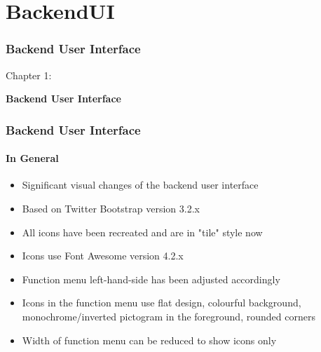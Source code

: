 %

\section{BackendUI}
\begin{frame}[fragile]
	\frametitle{Backend User Interface}

	\begin{center}\huge{Chapter 1:}\end{center}
	\begin{center}\huge{\color{typo3darkgrey}\textbf{Backend User Interface}}\end{center}

\end{frame}


\begin{frame}[fragile]
	\frametitle{Backend User Interface}
	\framesubtitle{In General}

	\begin{itemize}
		\item Significant visual changes of the backend user interface
		\item Based on Twitter Bootstrap version 3.2.x
		\item All icons have been recreated and are in "tile" style now
		\item Icons use Font Awesome version 4.2.x
		\item Function menu left-hand-side has been adjusted accordingly
		\item Icons in the function menu use flat design, colourful background,
			monochrome/inverted pictogram in the foreground, rounded corners
		\item Width of function menu can be reduced to show icons only

	\end{itemize}

\end{frame}

